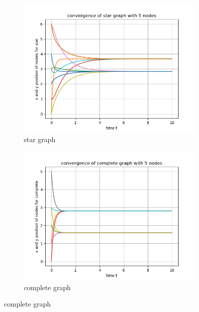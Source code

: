 \documentclass{article}
\begin{document}
\begin{problem}
\begin{figure}[!ht]
        \begin{subfigure}{0.4\textwidth}
            \includegraphics[width=\textwidth]{./img/p1convergence_star_graph_5.png}
            \caption{star graph}
        \end{subfigure}
        \begin{subfigure}{0.4\textwidth}
            \includegraphics[width=\textwidth]{./img/p1convergence_complete_graph_5.png}
            \caption{complete graph}
        \end{subfigure}
    \end{figure}
    \begin{figure}
        \centering
        \begin{subfigure}{0.4\textwidth}

\end{subfigure}
\end{figure}
\end{problem}
\end{document}
